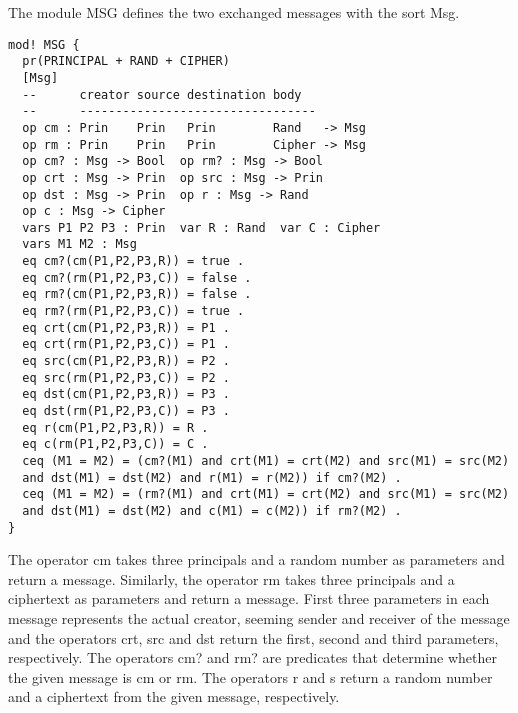 \documentclass[a4paper,fleqn]{cas-dc}
\begin{document}
The module MSG defines the two exchanged messages with the sort Msg.
\begin{small}
\begin{verbatim}
mod! MSG {
  pr(PRINCIPAL + RAND + CIPHER)
  [Msg]
  --      creator source destination body
  --      ---------------------------------
  op cm : Prin    Prin   Prin        Rand   -> Msg
  op rm : Prin    Prin   Prin        Cipher -> Msg
  op cm? : Msg -> Bool  op rm? : Msg -> Bool
  op crt : Msg -> Prin  op src : Msg -> Prin
  op dst : Msg -> Prin  op r : Msg -> Rand
  op c : Msg -> Cipher
  vars P1 P2 P3 : Prin  var R : Rand  var C : Cipher
  vars M1 M2 : Msg
  eq cm?(cm(P1,P2,P3,R)) = true .
  eq cm?(rm(P1,P2,P3,C)) = false .
  eq rm?(cm(P1,P2,P3,R)) = false .
  eq rm?(rm(P1,P2,P3,C)) = true .
  eq crt(cm(P1,P2,P3,R)) = P1 .
  eq crt(rm(P1,P2,P3,C)) = P1 .
  eq src(cm(P1,P2,P3,R)) = P2 .
  eq src(rm(P1,P2,P3,C)) = P2 .
  eq dst(cm(P1,P2,P3,R)) = P3 .
  eq dst(rm(P1,P2,P3,C)) = P3 .
  eq r(cm(P1,P2,P3,R)) = R .
  eq c(rm(P1,P2,P3,C)) = C .
  ceq (M1 = M2) = (cm?(M1) and crt(M1) = crt(M2) and src(M1) = src(M2)
  and dst(M1) = dst(M2) and r(M1) = r(M2)) if cm?(M2) .
  ceq (M1 = M2) = (rm?(M1) and crt(M1) = crt(M2) and src(M1) = src(M2)
  and dst(M1) = dst(M2) and c(M1) = c(M2)) if rm?(M2) .
}
\end{verbatim}
\end{small}
The operator cm takes three principals and a random number as parameters and return a message. Similarly, the operator rm takes three principals and a ciphertext as parameters and return a message. First three parameters in each message represents the actual creator, seeming sender and receiver of the message and the operators crt, src and dst return the first, second and third parameters, respectively. The operators cm? and rm? are predicates that determine whether the given message is cm or rm. The operators r and s return a random number and a ciphertext from the given message, respectively.
\end{document}
